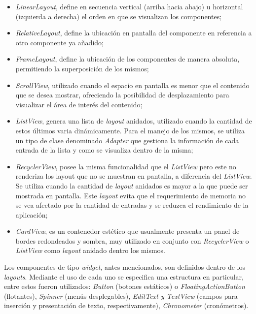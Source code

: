     \begin{itemize}
        \item \textit{LinearLayout}, define en secuencia vertical (arriba hacia abajo)  u horizontal (izquierda a derecha) el orden en que se visualizan los componentes;
        
        \item \textit{RelativeLayout}, define la ubicación en pantalla del componente en referencia a otro componente ya añadido;
        
        \item \textit{FrameLayout}, define la ubicación de los componentes de manera absoluta, permitiendo la superposición de los mismos;
        
        \item \textit{ScrollView}, utilizado cuando el espacio en pantalla es menor que el contenido que se desea mostrar, ofreciendo la posibilidad de desplazamiento para visualizar el área de interés del contenido;
        
        \item \textit{ListView}, genera una lista de \textit{layout} anidados, utilizado cuando la cantidad de estos últimos varia dinámicamente. Para el manejo de los mismos, se utiliza un tipo de clase denominado \textit{Adapter} que gestiona la información de cada entrada de la lista y como se visualiza dentro de la misma;
        
        \item \textit{RecyclerView}, posee la misma funcionalidad que el \textit{ListView} pero este no renderiza los layout que no se muestran en pantalla, a diferencia del \textit{ListView}. Se utiliza cuando la cantidad de \textit{layout} anidados es mayor a la que puede ser mostrada en pantalla. Este \textit{layout} evita que el requerimiento de memoria no se vea afectado por la cantidad de entradas y se reduzca el rendimiento de la aplicación;
        
        \item \textit{CardView}, es un contenedor estético que usualmente presenta un panel de bordes redondeados y sombra, muy utilizado en conjunto con \textit{RecyclerView} o \textit{ListView} como \textit{layout} anidado dentro los mismos.
        
    \end{itemize}

    
    \par Los componentes de tipo \textit{widget}, antes mencionados, son definidos dentro de los \textit{layouts}. Mediante el uso de cada uno se especifica una estructura en particular, entre estos fueron utilizados: \textit{Button} (botones estáticos) o \textit{FloatingActionButton}  (flotantes), \textit{Spinner} (menús desplegables), \textit{EditText y TextView} (campos para inserción y presentación de texto, respectivamente), \textit{Chronometer} (cronómetros).
        
